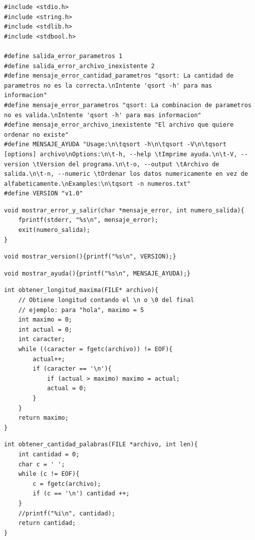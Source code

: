 \documentclass[a4paper, 12pt]{article}
\begin{document}
	\begin{lstlisting}
#include <stdio.h>
#include <string.h>
#include <stdlib.h>
#include <stdbool.h>

#define salida_error_parametros 1
#define salida_error_archivo_inexistente 2
#define mensaje_error_cantidad_parametros "qsort: La cantidad de parametros no es la correcta.\nIntente 'qsort -h' para mas informacion"
#define mensaje_error_parametros "qsort: La combinacion de parametros no es valida.\nIntente 'qsort -h' para mas informacion"
#define mensaje_error_archivo_inexistente "El archivo que quiere ordenar no existe"
#define MENSAJE_AYUDA "Usage:\n\tqsort -h\n\tqsort -V\n\tqsort [options] archivo\nOptions:\n\t-h, --help \tImprime ayuda.\n\t-V, --version \tVersion del programa.\n\t-o, --output \tArchivo de salida.\n\t-n, --numeric \tOrdenar los datos numericamente en vez de alfabeticamente.\nExamples:\n\tqsort -n numeros.txt"
#define VERSION "v1.0"
	\end{lstlisting}
	
	\begin{lstlisting}
void mostrar_error_y_salir(char *mensaje_error, int numero_salida){
	fprintf(stderr, "%s\n", mensaje_error);
    exit(numero_salida);
}
	\end{lstlisting}
	
	\begin{lstlisting}
void mostrar_version(){printf("%s\n", VERSION);}
	\end{lstlisting}
	
	\begin{lstlisting}
void mostrar_ayuda(){printf("%s\n", MENSAJE_AYUDA);}
	\end{lstlisting}
	
	\begin{lstlisting}
int obtener_longitud_maxima(FILE* archivo){
    // Obtiene longitud contando el \n o \0 del final
    // ejemplo: para "hola", maximo = 5
    int maximo = 0;
    int actual = 0;
    int caracter;
    while ((caracter = fgetc(archivo)) != EOF){
        actual++;
        if (caracter == '\n'){
            if (actual > maximo) maximo = actual;
            actual = 0;
        }
    }
    return maximo;
}
	\end{lstlisting}
	
	\begin{lstlisting}
int obtener_cantidad_palabras(FILE *archivo, int len){
    int cantidad = 0;
    char c = ' ';
    while (c != EOF){
        c = fgetc(archivo);
        if (c == '\n') cantidad ++;
    }
    //printf("%i\n", cantidad);
    return cantidad;
}
	\end{lstlisting}
	
\end{document}
